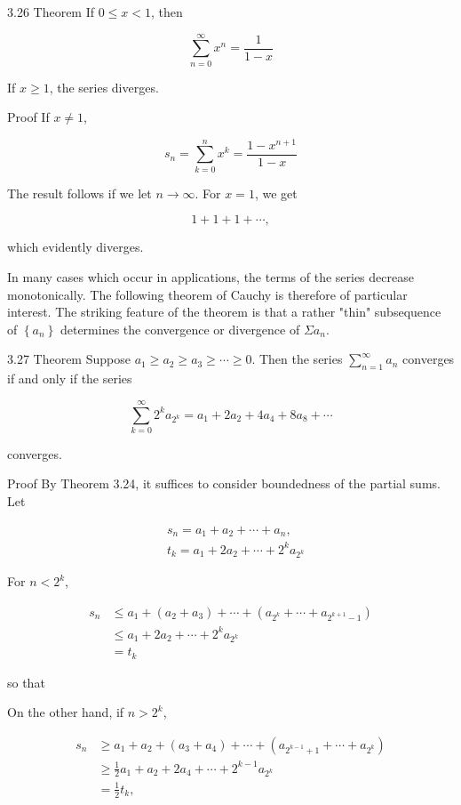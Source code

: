 \documentclass[10pt]{article}
\begin{document}
3.26 Theorem If $0 \leq x<1$, then

$$
\sum_{n=0}^{\infty} x^{n}=\frac{1}{1-x}
$$

If $x \geq 1$, the series diverges.

Proof If $x \neq 1$,

$$
s_{n}=\sum_{k=0}^{n} x^{k}=\frac{1-x^{n+1}}{1-x}
$$

The result follows if we let $n \rightarrow \infty$. For $x=1$, we get

$$
1+1+1+\cdots,
$$

which evidently diverges.

In many cases which occur in applications, the terms of the series decrease monotonically. The following theorem of Cauchy is therefore of particular interest. The striking feature of the theorem is that a rather "thin" subsequence of $\left\{a_{n}\right\}$ determines the convergence or divergence of $\Sigma a_{n}$.

3.27 Theorem Suppose $a_{1} \geq a_{2} \geq a_{3} \geq \cdots \geq 0$. Then the series $\sum_{n=1}^{\infty} a_{n}$ converges if and only if the series

$$
\sum_{k=0}^{\infty} 2^{k} a_{2^{k}}=a_{1}+2 a_{2}+4 a_{4}+8 a_{8}+\cdots
$$

converges.

Proof By Theorem 3.24, it suffices to consider boundedness of the partial sums. Let

$$
\begin{aligned}
& s_{n}=a_{1}+a_{2}+\cdots+a_{n}, \\
& t_{k}=a_{1}+2 a_{2}+\cdots+2^{k} a_{2^{k}}
\end{aligned}
$$

For $n<2^{k}$,

$$
\begin{aligned}
s_{n} & \leq a_{1}+\left(a_{2}+a_{3}\right)+\cdots+\left(a_{2^{k}}+\cdots+a_{2^{k+1}-1}\right) \\
& \leq a_{1}+2 a_{2}+\cdots+2^{k} a_{2^{k}} \\
& =t_{k}
\end{aligned}
$$

so that

On the other hand, if $n>2^{k}$,

$$
\begin{aligned}
s_{n} & \geq a_{1}+a_{2}+\left(a_{3}+a_{4}\right)+\cdots+\left(a_{2^{k-1}+1}+\cdots+a_{2^{k}}\right) \\
& \geq \frac{1}{2} a_{1}+a_{2}+2 a_{4}+\cdots+2^{k-1} a_{2^{k}} \\
& =\frac{1}{2} t_{k},
\end{aligned}
$$
\end{document}
